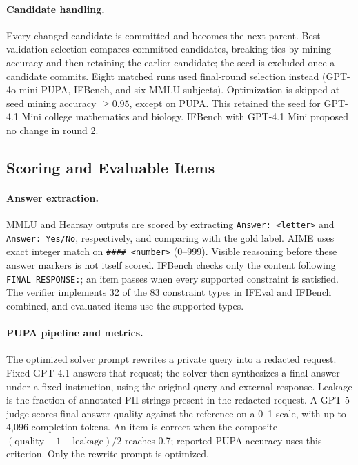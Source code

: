 \documentclass[10pt]{article} %
\begin{document}
\paragraph{Candidate handling.}
Every changed candidate is committed and becomes the next parent. Best-validation selection compares committed
candidates, breaking ties by mining accuracy and then retaining the earlier candidate; the seed is excluded once a
candidate commits. Eight matched runs used final-round selection instead (GPT-4o-mini PUPA, IFBench, and six MMLU
subjects). Optimization is skipped at seed mining accuracy $\geq 0.95$, except on PUPA. This retained the seed for
GPT-4.1 Mini college mathematics and biology. IFBench with GPT-4.1 Mini proposed no change in round 2.

\FloatBarrier
\subsection{Scoring and Evaluable Items}
\label{app:eval}
\paragraph{Answer extraction.}
MMLU and Hearsay outputs are scored by extracting \texttt{Answer: <letter>} and \texttt{Answer: Yes/No}, respectively,
and comparing with the gold label. AIME uses exact integer match on \texttt{\#\#\#\# <number>} (0--999). Visible
reasoning before these answer markers is not itself scored. IFBench checks only the content following
\texttt{FINAL RESPONSE:}; an item passes when every supported constraint is satisfied. The verifier implements 32
of the 83 constraint types in IFEval and IFBench combined, and evaluated items use the supported types.

\paragraph{PUPA pipeline and metrics.}
The optimized solver prompt rewrites a private query into a redacted request. Fixed GPT-4.1 answers that request;
the solver then synthesizes a final answer under a fixed instruction, using the original query and external response.
Leakage is the fraction of annotated PII strings present in the redacted request. A GPT-5 judge scores final-answer
quality against the reference on a 0--1 scale, with up to 4,096 completion tokens. An item is correct when the
composite $(\text{quality}+1-\text{leakage})/2$ reaches 0.7; reported PUPA accuracy uses this criterion. Only the
rewrite prompt is optimized.
\end{document}
